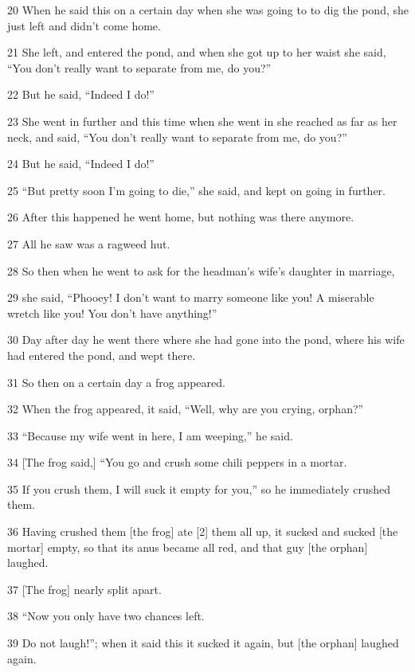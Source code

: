 {\LARGE{}20 When he said this on a certain day when she was going to to dig the
pond, she just left and didn't come home.}

{\LARGE{}21 She left, and entered the pond, and when she got up to her waist she
said, ``You don't really want to separate from me, do you?''}

{\LARGE{}22 But he said, ``Indeed I do!''}

{\LARGE{}23 She went in further and this time when she went in she reached as far
as her neck, and said, ``You don't really want to separate from me, do you?''}

{\LARGE{}24 But he said, ``Indeed I do!''}

{\LARGE{}25 ``But pretty soon I'm going to die,'' she said, and kept on going in
further.}

{\LARGE{}26 After this happened he went home, but nothing was there anymore.}

{\LARGE{}27 All he saw was a ragweed hut.}

{\LARGE{}28 So then when he went to ask for the headman's wife's daughter in marriage,}

{\LARGE{}29 she said, ``Phooey! I don't want to marry someone like you! A miserable
wretch like you! You don't have anything!''}

{\LARGE{}30 Day after day he went there where she had gone into the pond, where
his wife had entered the pond, and wept there.}

{\LARGE{}31 So then on a certain day a frog appeared.}

{\LARGE{}32 When the frog appeared, it said, ``Well, why are you crying, orphan?''}

{\LARGE{}33 ``Because my wife went in here, I am weeping,'' he said.}

{\LARGE{}34 [The frog said,] ``You go and crush some chili peppers in a mortar.}

{\LARGE{}35 If you crush them, I will suck it empty for you,'' so he immediately
crushed them.}

{\LARGE{}36 Having crushed them [the frog] ate [2] them all up, it sucked and sucked
[the mortar] empty, so that its anus became all red, and that guy [the orphan]
laughed.}

{\LARGE{}37 [The frog] nearly split apart.}

{\LARGE{}38 ``Now you only have two chances left.}

{\LARGE{}39 Do not laugh!''; when it said this it sucked it again, but [the orphan]
laughed again.}

